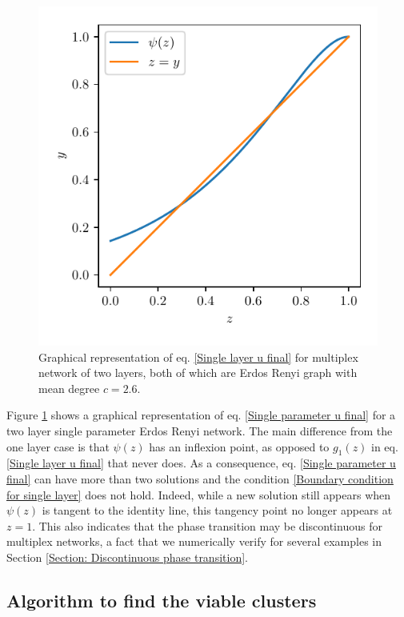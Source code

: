 \documentclass[
11pt, %
english, %
singlespacing, %
nolistspacing, %
liststotoc, %
headsepline, %
]{MastersDoctoralThesis} %
\begin{document}
\begin{figure}
	\includegraphics[scale=1]{single_param_u_solution_graphically.pdf}
	\caption{Graphical representation of eq. \eqref{Single layer u final} for multiplex network of two layers, both of which are Erdos Renyi graph with mean degree $c = 2.6$.}
	\label{Figure: Solution of u = psi(u) graphically for single param}
\end{figure}

Figure \ref{Figure: Solution of u = psi(u) graphically for single param} shows a graphical representation of eq. \eqref{Single parameter u final} for a two layer single parameter Erdos Renyi network. The main difference from the one layer case is that $\psi(z)$ has an inflexion point, as opposed to $g_1(z)$ in eq. \eqref{Single layer u final} that never does. As a consequence, eq. \eqref{Single parameter u final} can have more than two solutions and the condition \eqref{Boundary condition for single layer} does not hold. Indeed, while a new solution still appears when $\psi(z)$ is tangent to the identity line, this tangency point no longer appears at $z = 1$. This also indicates that the phase transition may be discontinuous for multiplex networks, a fact that we numerically verify for several examples in Section \ref{Section: Discontinuous phase transition}.

\subsection{Algorithm to find the viable clusters}
\end{document}
